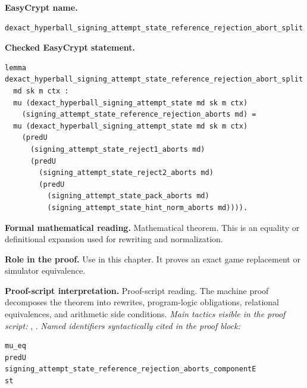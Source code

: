 \begin{formaltheorem}
\noindent\textbf{EasyCrypt name.}
\begin{lstlisting}[language=EasyCrypt,basicstyle=\ttfamily\scriptsize]
dexact_hyperball_signing_attempt_state_reference_rejection_abort_split
\end{lstlisting}
\noindent\textbf{Checked EasyCrypt statement.}
\begin{lstlisting}[language=EasyCrypt,basicstyle=\ttfamily\scriptsize]
lemma dexact_hyperball_signing_attempt_state_reference_rejection_abort_split
  md sk m ctx :
  mu (dexact_hyperball_signing_attempt_state md sk m ctx)
    (signing_attempt_state_reference_rejection_aborts md) =
  mu (dexact_hyperball_signing_attempt_state md sk m ctx)
    (predU
      (signing_attempt_state_reject1_aborts md)
      (predU
        (signing_attempt_state_reject2_aborts md)
        (predU
          (signing_attempt_state_pack_aborts md)
          (signing_attempt_state_hint_norm_aborts md)))).
\end{lstlisting}
\noindent\textbf{Formal mathematical reading.}
Mathematical theorem. This is an equality or definitional expansion used for rewriting and normalization.

\noindent\textbf{Role in the proof.}
Use in this chapter. It proves an exact game replacement or simulator equivalence.

\noindent\textbf{Proof-script interpretation.}
Proof-script reading. The machine proof decomposes the theorem into rewrites, program-logic obligations, relational equivalences, and arithmetic side conditions.
\emph{Main tactics visible in the proof script:} , .
\emph{Named identifiers syntactically cited in the proof block:}
\begin{lstlisting}[language=EasyCrypt,basicstyle=\ttfamily\scriptsize]
mu_eq
predU
signing_attempt_state_reference_rejection_aborts_componentE
st
\end{lstlisting}

\end{formaltheorem}

